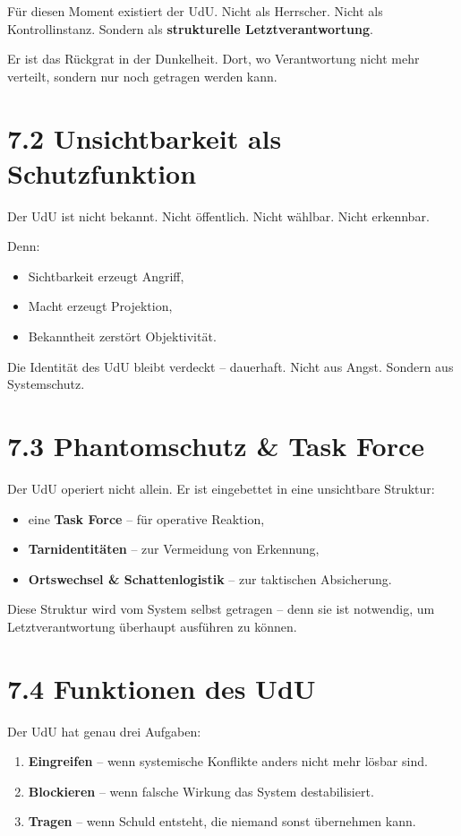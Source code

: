 \documentclass[12pt,a4paper]{book}
\begin{document}
Für diesen Moment existiert der UdU.  
Nicht als Herrscher. Nicht als Kontrollinstanz.  
Sondern als \textbf{strukturelle Letztverantwortung}.

Er ist das Rückgrat in der Dunkelheit.  
Dort, wo Verantwortung nicht mehr verteilt, sondern nur noch getragen werden kann.

\section*{7.2 Unsichtbarkeit als Schutzfunktion}

Der UdU ist nicht bekannt.  
Nicht öffentlich. Nicht wählbar. Nicht erkennbar.

Denn:  
\begin{itemize}
    \item Sichtbarkeit erzeugt Angriff,
    \item Macht erzeugt Projektion,
    \item Bekanntheit zerstört Objektivität.
\end{itemize}

Die Identität des UdU bleibt verdeckt – dauerhaft.  
Nicht aus Angst. Sondern aus Systemschutz.

\section*{7.3 Phantomschutz \& Task Force}

Der UdU operiert nicht allein.  
Er ist eingebettet in eine unsichtbare Struktur:

\begin{itemize}
    \item eine \textbf{Task Force} – für operative Reaktion,
    \item \textbf{Tarnidentitäten} – zur Vermeidung von Erkennung,
    \item \textbf{Ortswechsel \& Schattenlogistik} – zur taktischen Absicherung.
\end{itemize}

Diese Struktur wird vom System selbst getragen –  
denn sie ist notwendig, um Letztverantwortung überhaupt ausführen zu können.

\section*{7.4 Funktionen des UdU}

Der UdU hat genau drei Aufgaben:

\begin{enumerate}
    \item \textbf{Eingreifen} – wenn systemische Konflikte anders nicht mehr lösbar sind.
    \item \textbf{Blockieren} – wenn falsche Wirkung das System destabilisiert.
    \item \textbf{Tragen} – wenn Schuld entsteht, die niemand sonst übernehmen kann.
\end{enumerate}
\end{document}
